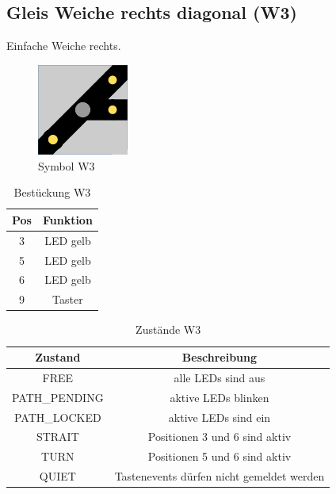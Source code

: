 \documentclass[10pt,a4paper]{article}
\begin{document}
\subsection{Gleis Weiche rechts diagonal (W3)}
Einfache Weiche rechts.
\begin{figure}[hbtp]
\centering
\includegraphics[width=3cm]{../folien/w3.png}
\caption{Symbol W3}
\end{figure}
\begin{table}[h!]
\centering
\begin{tabular}{c|c}
\textbf{Pos} & \textbf{Funktion} \\ \hline
3 & LED gelb \\
5 & LED gelb \\
6 & LED gelb \\
9 & Taster
\end{tabular}
\caption{Bestückung W3}
\end{table}
\begin{table}[h!]
\centering
\begin{tabular}{c|c}
\textbf{Zustand} & \textbf{Beschreibung} \\ \hline
FREE & alle LEDs sind aus \\
PATH\_PENDING & aktive LEDs blinken \\
PATH\_LOCKED & aktive LEDs sind ein \\
STRAIT & Positionen 3 und 6 sind aktiv \\
TURN & Positionen 5 und 6 sind aktiv\\
QUIET & Tastenevents dürfen nicht gemeldet werden
\end{tabular}
\caption{Zustände W3}
\end{table}

\newpage
\end{document}
